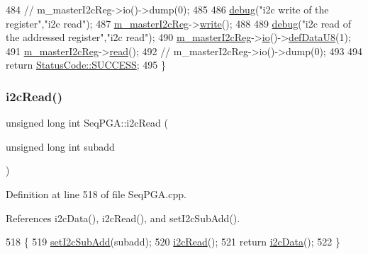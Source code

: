 \begin{DoxyCode}
484   \textcolor{comment}{//  m\_masterI2cReg->io()->dump(0);}
485 
486   \hyperlink{classObject_aac010553f022165573714b7014a15f0d}{debug}(\textcolor{stringliteral}{"i2c write of the register"},\textcolor{stringliteral}{"i2c read"});
487   \hyperlink{classSeqPGA_a942c71b33a4f43b7a994cb9216abb17e}{m\_masterI2cReg}->\hyperlink{classIOobject_a9f6984bc9f0fadcf800f1be2523ac744}{write}();
488 
489   \hyperlink{classObject_aac010553f022165573714b7014a15f0d}{debug}(\textcolor{stringliteral}{"i2c read of the addressed register"},\textcolor{stringliteral}{"i2c read"});
490   \hyperlink{classSeqPGA_a942c71b33a4f43b7a994cb9216abb17e}{m\_masterI2cReg}->\hyperlink{classIOobject_af04fb94137c3d86849f478ac5afab5d1}{io}()->\hyperlink{classIOdata_a80bb230b61062b447db5832e43bf7b44}{defDataU8}(1);
491   \hyperlink{classSeqPGA_a942c71b33a4f43b7a994cb9216abb17e}{m\_masterI2cReg}->\hyperlink{classIOobject_aa07610c11963b1db6710e3c76ceea456}{read}();
492   \textcolor{comment}{//  m\_masterI2cReg->io()->dump(0);}
493 
494   \textcolor{keywordflow}{return} \hyperlink{classStatusCode_a6f565cbeadc76d14c72f047e5e85eb4badd0da38d3ba0d922efd1f4619bc37ad8}{StatusCode::SUCCESS};
495 \}
\end{DoxyCode}
\mbox{\label{classSeqPGA_a9cf54d57d77b04f54cc0fe516c3528b4}} 
\subsubsection{\texorpdfstring{i2c\+Read()}{i2cRead()}\hspace{0.1cm}{\footnotesize\ttfamily [2/2]}}
{\footnotesize\ttfamily unsigned long int Seq\+P\+G\+A\+::i2c\+Read (\begin{DoxyParamCaption}\item[{unsigned long int}]{subadd }\end{DoxyParamCaption})}



Definition at line 518 of file Seq\+P\+G\+A.\+cpp.



References i2c\+Data(), i2c\+Read(), and set\+I2c\+Sub\+Add().


\begin{DoxyCode}
518                                                          \{
519   \hyperlink{classSeqPGA_a348c5d982223fb5cf2878e5bf3c6429c}{setI2cSubAdd}(subadd);
520   \hyperlink{classSeqPGA_a7cd344df2be99f3a02b487f80e87b27e}{i2cRead}();
521   \textcolor{keywordflow}{return} \hyperlink{classSeqPGA_a5e48f7b7ca1ada5a1decc0436dda4b26}{i2cData}();
522 \}
\end{DoxyCode}
\mbox{\label{classSeqPGA_a6c7137f9b45a20ecfcccf1d47e5af985}} 

